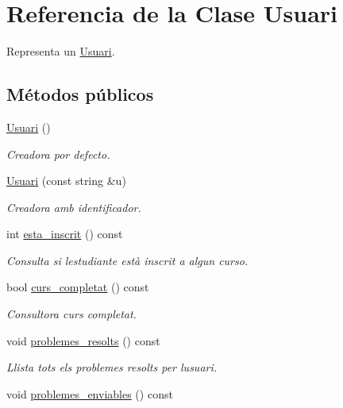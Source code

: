 \hypertarget{class_usuari}{}\section{Referencia de la Clase Usuari}
\label{class_usuari}


Representa un \mbox{\hyperlink{class_usuari}{Usuari}}.  


\subsection*{Métodos públicos}
\begin{DoxyCompactItemize}
\item 
\mbox{\hyperlink{class_usuari_ac6a1fbc3d6967c6de677580c60dfaaf4}{Usuari}} ()
\begin{DoxyCompactList}\small\item\em Creadora por defecto. \end{DoxyCompactList}\item 
\mbox{\hyperlink{class_usuari_a7f5c33ccd547e24683f5d868700574d6}{Usuari}} (const string \&u)
\begin{DoxyCompactList}\small\item\em Creadora amb identificador. \end{DoxyCompactList}\item 
int \mbox{\hyperlink{class_usuari_a0d20c2d77d8231d9a7e3e00a42a7e7c8}{esta\+\_\+inscrit}} () const
\begin{DoxyCompactList}\small\item\em Consulta si l\textquotesingle{}estudiante està inscrit a algun curso. \end{DoxyCompactList}\item 
bool \mbox{\hyperlink{class_usuari_a3cb6bb4ab49c3f858f3588c77af11527}{curs\+\_\+completat}} () const
\begin{DoxyCompactList}\small\item\em Consultora curs completat. \end{DoxyCompactList}\item 
void \mbox{\hyperlink{class_usuari_a3ef9f5ec04fe13ecfaf6d2f02bcd30bd}{problemes\+\_\+resolts}} () const
\begin{DoxyCompactList}\small\item\em Llista tots els problemes resolts per l\textquotesingle{}usuari. \end{DoxyCompactList}\item 
void \mbox{\hyperlink{class_usuari_a84e0532f6b7ae4c4022e4739ca7abade}{problemes\+\_\+enviables}} () const

\end{DoxyCompactItemize}
